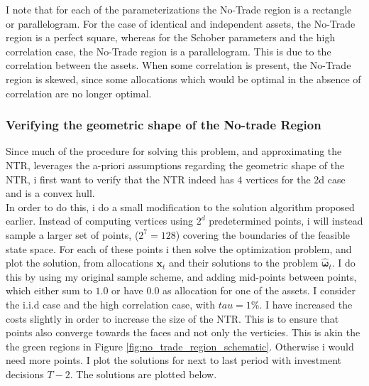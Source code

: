 \documentclass[11pt]{article}
\begin{document}
I note that for each of the parameterizations the No-Trade region is a rectangle or parallelogram.
For the case of identical and independent assets, the No-Trade region is a perfect square, whereas for the Schober parameters and the high correlation case,
the No-Trade region is a parallelogram. This is due to the correlation between the assets. When some correlation is present, the No-Trade region is skewed,
since some allocations which would be optimal in the absence of correlation are no longer optimal.

\subsubsection{Verifying the geometric shape of the No-trade Region}\label{Subsubsection: ConfirmShape}
Since much of the procedure for solving this problem, and approximating the NTR, leverages
the a-priori assumptions regarding the geometric shape of the NTR, i first want to verify that the
NTR indeed has $4$ vertices for the 2d case and is a convex hull.\\
In order to do this, i do a small modification to the solution algorithm proposed earlier.
Instead of computing vertices using $2^{d}$ predetermined points, i will instead
sample a larger set of points, ($2^7 = 128$) covering the boundaries of the feasible state space.
For each of these points i then solve the optimization problem,
and plot the solution, from allocations $\mathbf{x}_{t}$ and their solutions to the problem $\hat{\boldsymbol{\omega}}_{t}$.
I do this by using my original sample scheme, and adding mid-points between points,
which either sum to $1.0$ or have $0.0$ as allocation for one of the assets.
I consider the i.i.d case and the high correlation case, with $tau = 1\%$. I have increased the costs slightly in order to increase the
size of the NTR. This is to ensure that points also converge towards the faces and not only the verticies.
This is akin the the green regions in Figure \ref{fig:no_trade_region_schematic}.
Otherwise i would need more points. I plot the solutions for next to last period with investment decisions $T-2$.
The solutions are plotted below.
\end{document}
